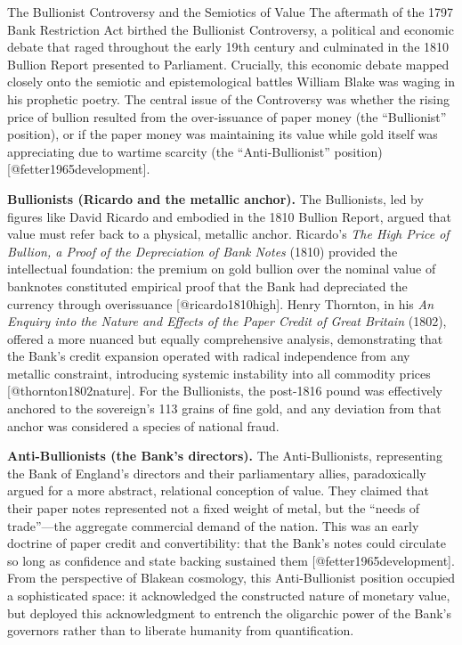 \documentclass[
  ignorenonframetext,
]{beamer}
\author{\texorpdfstring{}{}}
\date{}
\begin{document}
\begin{frame}{The Bullionist Controversy and the Semiotics of Value}
\protect{}\label{sec-bullionist-controversy}
The aftermath of the 1797 Bank Restriction Act birthed the Bullionist
Controversy, a political and economic debate that raged throughout the
early 19th century and culminated in the 1810 Bullion Report presented
to Parliament. Crucially, this economic debate mapped closely onto the
semiotic and epistemological battles William Blake was waging in his
prophetic poetry. The central issue of the Controversy was whether the
rising price of bullion resulted from the over-issuance of paper money
(the ``Bullionist'' position), or if the paper money was maintaining its
value while gold itself was appreciating due to wartime scarcity (the
``Anti-Bullionist'' position) {[}@fetter1965development{]}.

\textbf{Bullionists (Ricardo and the metallic anchor).} The Bullionists,
led by figures like David Ricardo and embodied in the 1810 Bullion
Report, argued that value must refer back to a physical, metallic
anchor. Ricardo's \emph{The High Price of Bullion, a Proof of the
Depreciation of Bank Notes} (1810) provided the intellectual foundation:
the premium on gold bullion over the nominal value of banknotes
constituted empirical proof that the Bank had depreciated the currency
through overissuance {[}@ricardo1810high{]}. Henry Thornton, in his
\emph{An Enquiry into the Nature and Effects of the Paper Credit of
Great Britain} (1802), offered a more nuanced but equally comprehensive
analysis, demonstrating that the Bank's credit expansion operated with
radical independence from any metallic constraint, introducing systemic
instability into all commodity prices {[}@thornton1802nature{]}. For the
Bullionists, the post-1816 pound was effectively anchored to the
sovereign's 113 grains of fine gold, and any deviation from that anchor
was considered a species of national fraud.

\textbf{Anti-Bullionists (the Bank's directors).} The Anti-Bullionists,
representing the Bank of England's directors and their parliamentary
allies, paradoxically argued for a more abstract, relational conception
of value. They claimed that their paper notes represented not a fixed
weight of metal, but the ``needs of trade''---the aggregate commercial
demand of the nation. This was an early doctrine of paper credit and
convertibility: that the Bank's notes could circulate so long as
confidence and state backing sustained them
{[}@fetter1965development{]}. From the perspective of Blakean cosmology,
this Anti-Bullionist position occupied a sophisticated space: it
acknowledged the constructed nature of monetary value, but deployed this
acknowledgment to entrench the oligarchic power of the Bank's governors
rather than to liberate humanity from quantification.


\end{frame}
\end{document}

